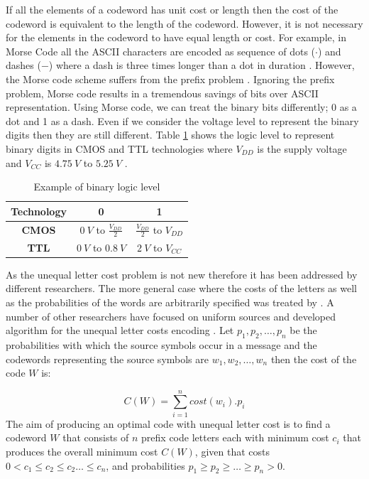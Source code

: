 \documentclass[twocolumn,12pt,a4paper]{article}
\begin{document}
If all the elements of a codeword has unit cost or length then the cost of the codeword is equivalent to the length of the codeword. However, it is not necessary for the elements in the codeword to have equal length or cost. For example, in Morse Code all the ASCII characters are encoded as sequence of dots ($\cdot$) and dashes ($-$) where a dash is three times longer than a dot in duration \citep{Redmond09}. However, the Morse code scheme suffers from the prefix problem \citep{Gr03}. Ignoring the prefix problem, Morse code results in a tremendous savings of bits over ASCII representation. Using Morse code, we can treat the binary bits differently; 0 as a dot and 1 as a dash. Even if we consider the voltage level to represent the binary digits then they are still different. Table \ref{table1} shows the logic level to represent binary digits in CMOS and TTL technologies where $V_{DD}$ is the supply voltage and $V_{CC}$ is $4.75~V$ to $5.25~V$ . 

\begin{table}[h]
\renewcommand{\arraystretch}{1.5}
\caption{Example of binary logic level}
\label{table1}
\centering
\begin{tabular}{| c | c | c |}
\hline
 \bfseries Technology  & 0 & 1\\
\hline
\bfseries CMOS & $0~V$ to $\frac{V_{DD}}{2}$&$\frac{V_{DD}}{2}$ to $V_{DD}$\\
\hline
\bfseries TTL & $0~V$ to $0.8~V$&$2~V$ to $V_{CC}$ \\
\hline
\end{tabular}
\end{table}

As the unequal letter cost problem is not new therefore it has been addressed by different researchers. The more general case where the costs of the letters as well as the probabilities of the words are arbitrarily specified was treated by \citet{Karp61}. A number of other researchers have focused on uniform sources and developed algorithm for the unequal letter costs encoding \citep{Gil95, Kar62,Varn71,AltMel80,perl1975}.  Let $p_1,p_2,\ldots,p_n$ be the probabilities with which the source symbols occur in a message and the codewords representing the source symbols are $w_1,w_2,\ldots,w_n$ then the cost of the code $W$ is:

\begin{equation}
C\left(W\right)=\sum_{i=1}^{n}cost\left(w_i\right).p_i 
\end{equation}
The aim of producing an optimal code with unequal letter cost is to find a codeword $W$ that consists of $n$ prefix code letters each with minimum cost $c_i$ that produces the overall minimum cost $C\left(W\right)$, given that costs $0<c_1\leq c_2 \leq c_2 \ldots \leq c_n$, and probabilities $p_1\geq p_2\geq \ldots\geq p_n>0$.
\end{document}
